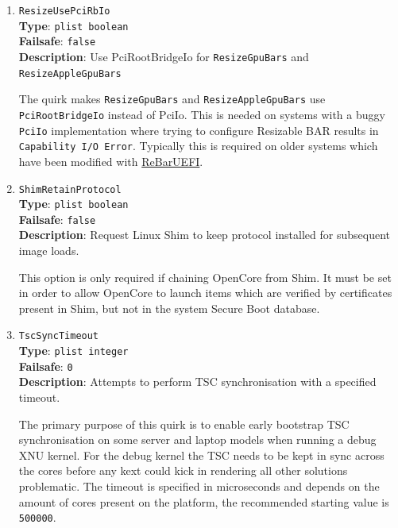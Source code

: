 \documentclass[]{article}
\begin{document}
\begin{enumerate}
  \emph{Note 1}: This quirk shall not be used to workaround macOS limitation
  to address BARs over 1 GB. \texttt{ResizeAppleGpuBars} should be used instead.

  \emph{Note 2}: While this quirk can increase GPU PCI BAR sizes, this will not
  work on most firmware as is, because the quirk does not relocate BARs in memory,
  and they will likely overlap. In most cases it is best to either update the
  firmware to the latest version or customise it with a specialised driver
  like \href{https://github.com/xCuri0/ReBarUEFI}{ReBarUEFI}.

\item
  \texttt{ResizeUsePciRbIo}\\
  \textbf{Type}: \texttt{plist\ boolean}\\
  \textbf{Failsafe}: \texttt{false}\\
  \textbf{Description}: Use PciRootBridgeIo for \texttt{ResizeGpuBars} and \texttt{ResizeAppleGpuBars}

  The quirk makes \texttt{ResizeGpuBars} and \texttt{ResizeAppleGpuBars} use \texttt{PciRootBridgeIo} instead of PciIo.
  This is needed on systems with a buggy \texttt{PciIo} implementation where trying to configure
  Resizable BAR results in \texttt{Capability I/O Error}. Typically this is required on
  older systems which have been modified with \href{https://github.com/xCuri0/ReBarUEFI}{ReBarUEFI}.

\item
  \texttt{ShimRetainProtocol}\\
  \textbf{Type}: \texttt{plist\ boolean}\\
  \textbf{Failsafe}: \texttt{false}\\
  \textbf{Description}: Request Linux Shim to keep protocol installed for subsequent image loads.

  This option is only required if chaining OpenCore from Shim. It must be set in order to allow
  OpenCore to launch items which are verified by certificates present in Shim, but not in the
  system Secure Boot database.

\item
  \texttt{TscSyncTimeout}\\
  \textbf{Type}: \texttt{plist\ integer}\\
  \textbf{Failsafe}: \texttt{0}\\
  \textbf{Description}: Attempts to perform TSC synchronisation with a specified timeout.

  The primary purpose of this quirk is to enable early bootstrap TSC synchronisation
  on some server and laptop models when running a debug XNU kernel. For the debug kernel
  the TSC needs to be kept in sync across the cores before any kext could kick in rendering
  all other solutions problematic. The timeout is specified in microseconds and depends on the
  amount of cores present on the platform, the recommended starting value is \texttt{500000}.


\end{enumerate}
\end{document}
